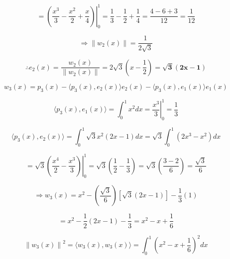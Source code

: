 \documentclass[fleqn]{article}
\newcommand{\norm}[1]{\left \lVert #1 \right \rVert}
\begin{document}
\begin{enumerate}[nolistsep]
		\begin{equation*}
			= \left.\left(\frac{x^3}{3} - \frac{x^2}{2} + \frac{x}{4}\right)\right\vert_{0}^{1} = \frac{1}{3} - \frac{1}{2} + \frac{1}{4} = \frac{4 - 6 + 3}{12} = \frac{1}{12}
		\end{equation*}
		
		\begin{equation*}
			\Rightarrow \norm{w_2(x)} = \frac{1}{2\sqrt{3}}
		\end{equation*}
			
		\begin{equation*}
			\therefore e_2(x) = \frac{w_2(x)}{\norm{w_2(x)}} = 2\sqrt{3}\left(x - \frac{1}{2}\right) = \mathbf{\sqrt{3}(2x - 1)}
		\end{equation*}
		
		\begin{equation*}
			w_3(x) = p_3(x) - \langle p_3(x), e_2(x) \rangle e_2(x) - \langle p_3(x), e_1(x) \rangle e_1(x)
		\end{equation*}
		
		\begin{equation*}
			\langle p_3(x), e_1(x) \rangle = \int_{0}^{1}{x^{2}dx} = \left.\frac{x^3}{3}\right\vert_{0}^{1} = \frac{1}{3}
		\end{equation*}
		
		\begin{equation*}
			\langle p_3(x), e_2(x) \rangle = \int_{0}^{1}{\sqrt{3}x^{2}(2x - 1)dx} = \sqrt{3}\int_{0}^{1}{(2x^{3} - x^2)dx}
		\end{equation*}
		
		\begin{equation*}
		 	= \sqrt{3}\left.\left(\frac{x^{4}}{2} - \frac{x^{3}}{3}\right)\right\vert_{0}^{1} = \sqrt{3}\left(\frac{1}{2} - \frac{1}{3}\right) = \sqrt{3}\left(\frac{3 - 2}{6}\right) = \frac{\sqrt{3}}{6}
		\end{equation*}
		
		\begin{equation*}
			\Rightarrow w_3(x) = x^2  - \left(\frac{\sqrt{3}}{6}\right)[\sqrt{3}(2x - 1)] - \frac{1}{3}(1)
		\end{equation*}
		
		\begin{equation*}
			 = x^2 - \frac{1}{2}(2x - 1) - \frac{1}{3} = x^2 - x + \frac{1}{6}
		\end{equation*}
		
		\begin{equation*}
			\norm{w_3(x)}^2 = \langle w_3(x), w_3(x) \rangle = \int_{0}^{1}{\left(x^2 - x + \frac{1}{6}\right)^{2}dx}
		\end{equation*}
		

\end{enumerate}
\end{document}
